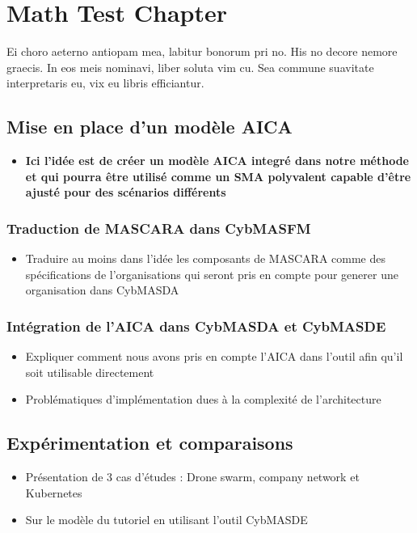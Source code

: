 \chapter{Math Test Chapter}\label{ch:mathtest} %
Ei choro aeterno antiopam mea, labitur bonorum pri no. His no decore
nemore graecis. In eos meis nominavi, liber soluta vim cu. Sea commune
suavitate interpretaris eu, vix eu libris efficiantur.




\section{Mise en place d'un modèle AICA}
\begin{itemize}

    \item \textbf{Ici l'idée est de créer un modèle AICA integré dans notre méthode et qui pourra être utilisé comme un SMA polyvalent capable d'être ajusté pour des scénarios différents}
\end{itemize}
\subsection{Traduction de MASCARA dans CybMASFM}
\begin{itemize}

    \item Traduire au moins dans l'idée les composants de MASCARA comme des spécifications de l'organisations qui seront pris en compte pour generer une organisation dans CybMASDA
\end{itemize}
\subsection{Intégration de l'AICA dans CybMASDA et CybMASDE}
\begin{itemize}

    \item Expliquer comment nous avons pris en compte l'AICA dans l'outil afin qu'il soit utilisable directement
    \item Problématiques d'implémentation dues à la complexité de l'architecture
\end{itemize}


\section{Expérimentation et comparaisons}
\begin{itemize}

    \item Présentation de 3 cas d’études : Drone swarm, company network et Kubernetes
    \item Sur le modèle du tutoriel en utilisant l'outil CybMASDE
\end{itemize}
